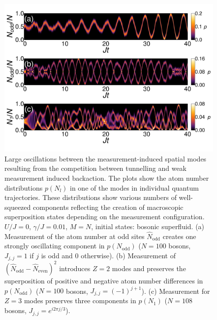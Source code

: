 \begin{figure}[htbp!]
  \centering
  \includegraphics[width=\textwidth]{Oscillations}
  \caption[Macroscopic Oscillations due to Weak Measurement]{Large
    oscillations between the measurement-induced spatial modes
    resulting from the competition between tunnelling and weak
    measurement induced backaction. The plots show the atom number
    distributions $p(N_l)$ in one of the modes in individual quantum
    trajectories. These distributions show various numbers of
    well-squeezed components reflecting the creation of macroscopic
    superposition states depending on the measurement
    configuration. $U/J = 0$, $\gamma/J = 0.01$, $M=N$, initial
    states: bosonic superfluid. (a) Measurement of the atom number at
    odd sites $\hat{N}_\mathrm{odd}$ creates one strongly oscillating
    component in $p(N_\mathrm{odd})$ ($N = 100$ bosons, $J_{j,j} = 1$
    if $j$ is odd and 0 otherwise). (b) Measurement of
    $(\hat{N}_\mathrm{odd} - \hat{N}_\mathrm{even})^2$ introduces
    $Z = 2$ modes and preserves the superposition of positive and
    negative atom number differences in $p(N_\mathrm{odd})$ ($N = 100$
    bosons, $J_{j,j} = (-1)^{j+1}$). (c) Measurement for $Z = 3$ modes
    preserves three components in $p(N_1)$ ($N = 108$ bosons,
    $J_{j,j} = e^{i 2 \pi j / 3}$).}
  \label{fig:oscillations}
\end{figure}


